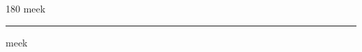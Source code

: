 
\begin{frame}
\begin{center}
\begin{turn}{180}
{\fontsize{2.5cm}{1em}\selectfont meek}
\end{turn}
\vspace{1em}\par  
\hrule
\vspace{1em}\par  
{\fontsize{2.5cm}{1em}\selectfont meek}
\end{center}
\end{frame}
